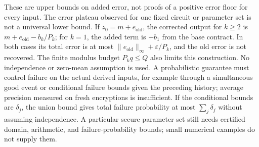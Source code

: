 These are upper bounds on added error, not proofs of a positive error floor for every input. The error plateau observed for one fixed circuit or parameter set is not a universal lower bound. If $z_0=m+e_{\mathrm{old}}$, the corrected output for $k\geq2$ is $m+e_{\mathrm{old}}-b_k/P_k$; for $k=1$, the added term is $+b_1$ from the base contract. In both cases its total error is at most $\|e_{\mathrm{old}}\|_\infty+\varepsilon/P_k$, and the old error is not recovered. The finite modulus budget $P_kq\leq Q$ also limits this construction. No independence or zero-mean assumption is used. A probabilistic guarantee must control failure on the actual derived inputs, for example through a simultaneous good event or conditional failure bounds given the preceding history; average precision measured on fresh encryptions is insufficient. If the conditional bounds are $\delta_j$, the union bound gives total failure probability at most $\sum_j\delta_j$ without assuming independence. A particular secure parameter set still needs certified domain, arithmetic, and failure-probability bounds; small numerical examples do not supply them.


